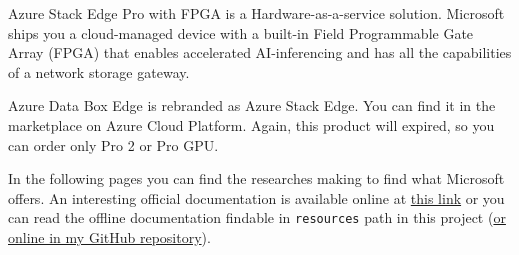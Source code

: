 \documentclass[a4paper]{article}
\begin{document}
    \noindent
    Azure Stack Edge Pro with FPGA is a Hardware-as-a-service solution. Microsoft ships you a cloud-managed device with a built-in Field Programmable Gate Array (FPGA) that enables accelerated AI-inferencing and has all the capabilities of a network storage gateway.\newline

    \noindent
    Azure Data Box Edge is rebranded as Azure Stack Edge. You can find it in the marketplace on Azure Cloud Platform. Again, this product will expired, so you can order only Pro 2 or Pro GPU.\newline

    \noindent
    In the following pages you can find the researches making to find what Microsoft offers. An interesting official documentation is available online at \href{https://learn.microsoft.com/en-us/azure/databox-online/azure-stack-edge-overview}{this link} or you can read the offline documentation findable in \texttt{resources} path in this project (\href{https://github.com/AndreVale69/FPGA-project-presentation/blob/main/resources/Azure%20Stack%20Edge%20-%20Documentation.zip}{or online in my GitHub repository}).
\end{document}
